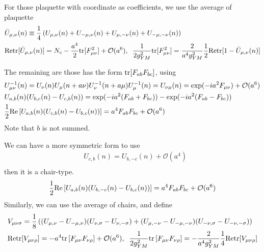For those plaquette with coordinate as coefficients, we use the average of plaquette
\begin{equation}
\begin{split}
&\bar{U}_{\mu, \nu}(n)\equiv \frac{1}{4}\left(U_{\mu, \nu}(n)+U_{-\mu ,\nu}(n)+U_{\mu, -\nu}(n)+U_{-\mu, -\nu}(n)\right)\\
&{\rm Retr}[\bar{U}_{\mu, \nu}(n)]=N_c-\frac{a^4}{2}{\rm tr}[F_{\mu\nu}^2]+\mathcal{O}(a^6),\;\;\frac{1}{2g_{YM}^2}{\rm tr}[F_{\mu\nu}^2]=\frac{2}{a^4g_{YM}^2}\frac{1}{2}{\rm Retr}[1-\bar{U}_{\mu, \nu}(n)]\\
\end{split}
\end{equation}

The remaining are those has the form ${\rm tr}[F_{ab}F_{bc}]$, using
\begin{equation}
\begin{split}
&U_{\mu\nu}^{-1}(n)=U_{\nu}(n)U_{\mu}(n+a\nu)U^{-1}_{\nu}(n+a\mu)U^{-1}_{\mu}(n)=U_{\nu\mu}(n)=\exp (-ia^2 F_{\mu\nu})+\mathcal{O}(a^6)\\
&U_{a,b}(n)(U_{b,c}(n)-U_{c,b}(n))=\exp (-ia^2 (F_{ab}+F_{bc}))-\exp (-ia^2 (F_{ab}-F_{bc}))\\
&\frac{1}{2}{\rm Re}\left[U_{a,b}(n)(U_{c,b}(n)-U_{b,c}(n))\right]=a^4F_{ab}F_{bc}+\mathcal{O}(a^6)\\
\end{split}
\end{equation}
Note that $b$ is not summed.

We can have a more symmetric form to use
\begin{equation}
\begin{split}
&U_{c,b}(n)=U_{b,-c}(n)+\mathcal{O}(a^4)\\
\end{split}
\end{equation}
then it is a chair-type.
\begin{equation}
\begin{split}
&\frac{1}{2}{\rm Re}\left[U_{a,b}(n)(U_{b,-c}(n)-U_{b,c}(n))\right]=a^4F_{ab}F_{bc}+\mathcal{O}(a^6)\\
\end{split}
\end{equation}
Similarly, we can use the average of chairs, and define
\begin{equation}
\begin{split}
&V_{\mu\nu\sigma}=\frac{1}{8}\left((U_{\mu,\nu}-U_{-\mu,\nu})(U_{\nu,\sigma}-U_{\nu,-\sigma})+(U_{\mu,-\nu}-U_{-\mu,-\nu})(U_{-\nu,\sigma}-U_{-\nu,-\sigma})\right)\\
&{\rm Retr}[V_{\mu\nu\rho}]=-a^4{\rm tr}\left[F_{\mu\nu}F_{\nu\rho}\right]+\mathcal{O}(a^6),\;\;\frac{1}{2g_{YM}^2}{\rm tr}\left[F_{\mu\nu}F_{\nu\rho}\right]=-\frac{2}{a^4g_{YM}^2}\frac{1}{4}{\rm Retr}[V_{\mu\nu\rho}]\\
\end{split}
\end{equation}

